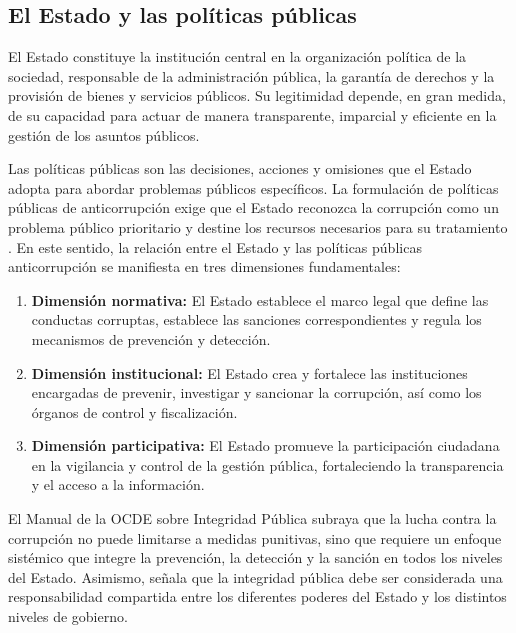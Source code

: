 \documentclass[12pt,a4paper]{article}
\begin{document}
\subsection{El Estado y las políticas públicas}

El Estado constituye la institución central en la organización política de la sociedad, responsable de la administración pública, la garantía de derechos y la provisión de bienes y servicios públicos. Su legitimidad depende, en gran medida, de su capacidad para actuar de manera transparente, imparcial y eficiente en la gestión de los asuntos públicos.

Las políticas públicas son las decisiones, acciones y omisiones que el Estado adopta para abordar problemas públicos específicos. La formulación de políticas públicas de anticorrupción exige que el Estado reconozca la corrupción como un problema público prioritario y destine los recursos necesarios para su tratamiento \parencite{ocde2020}. En este sentido, la relación entre el Estado y las políticas públicas anticorrupción se manifiesta en tres dimensiones fundamentales:

\begin{enumerate}
    \item \textbf{Dimensión normativa:} El Estado establece el marco legal que define las conductas corruptas, establece las sanciones correspondientes y regula los mecanismos de prevención y detección.
    
    \item \textbf{Dimensión institucional:} El Estado crea y fortalece las instituciones encargadas de prevenir, investigar y sancionar la corrupción, así como los órganos de control y fiscalización.
    
    \item \textbf{Dimensión participativa:} El Estado promueve la participación ciudadana en la vigilancia y control de la gestión pública, fortaleciendo la transparencia y el acceso a la información.
\end{enumerate}

El Manual de la OCDE sobre Integridad Pública \parencite{ocde2020} subraya que la lucha contra la corrupción no puede limitarse a medidas punitivas, sino que requiere un enfoque sistémico que integre la prevención, la detección y la sanción en todos los niveles del Estado. Asimismo, señala que la integridad pública debe ser considerada una responsabilidad compartida entre los diferentes poderes del Estado y los distintos niveles de gobierno.
\end{document}
